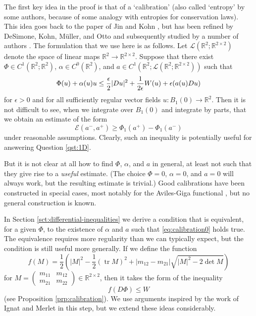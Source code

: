 \documentclass[a4paper]{article}
\newcommand{\R}{\mathbb{R}}
\let\div\relax\DeclareMathOperator{\div}{div}
\DeclareMathOperator{\tr}{tr}
\theoremstyle{definition}
\theoremstyle{remark}
\begin{document}
The first key idea in the proof is that of a `calibration' (also called `entropy' by some
authors, because of some analogy with entropies for conservation laws). This idea
goes back to the paper of Jin and Kohn \cite{Jin-Kohn:00}, but has been refined by
DeSimone, Kohn, M\"uller, and Otto \cite{DeSimone-Kohn-Mueller-Otto:01} and subsequently
studied by a number of authors
\cite{DeLellis-Otto:03, Ignat-Merlet:11, Ignat-Merlet:12, Ignat-Moser:12, Ignat-Monteil:20}.
The formulation that we use here is as follows. Let $\mathcal{L}(\R^2; \R^{2 \times 2})$
denote the space of linear maps $\R^2 \to \R^{2 \times 2}$. Suppose that there exist
$\Phi \in C^1(\R^2; \R^2)$, $\alpha \in C^0(\R^2)$, and $a \in C^1(\R^2; \mathcal{L}(\R^2; \R^{2 \times 2}))$
such that
\begin{equation} \label{eq:calibration0}
\div \Phi(u) + \alpha(u) \div u \le \frac{\epsilon}{2} |Du|^2 + \frac{1}{2\epsilon} W(u) + \epsilon \div(a(u) Du)
\end{equation}
for $\epsilon > 0$ and for all sufficiently regular vector fields $u \colon B_1(0) \to \R^2$.
Then it is not difficult to see, when we integrate over $B_1(0)$ and integrate by parts,
that we obtain an estimate of the form
\[
\mathcal{E}(a^-, a^+) \ge \Phi_1(a^+) - \Phi_1(a^-)
\]
under reasonable assumptions. Clearly, such an inequality is potentially useful for
answering Question \ref{qst:1D}.

But it is not clear at all how to find $\Phi$, $\alpha$, and $a$ in general, at least not
such that they give rise to a \emph{useful} estimate. (The choice $\Phi = 0$, $\alpha = 0$, and
$a = 0$ will always work, but the resulting estimate is trivial.) Good calibrations have
been constructed in special cases, most notably for the Aviles-Giga functional \cite{Jin-Kohn:00},
but no general construction is known.

In Section \ref{sct:differential-inequalities} we derive a condition that is equivalent, for a given
$\Phi$, to the existence of $\alpha$ and $a$ such that \eqref{eq:calibration0} holds true. The equivalence requires more regularity than we can typically
expect, but the condition is still useful more generally.
If we define the function
\[
f(M) = \frac{1}{2} \left(|M|^2 - \frac{1}{2} (\tr M)^2 + |m_{12} - m_{21}| \sqrt{|M|^2 - 2\det M}\right)
\]
for $M = (\begin{smallmatrix} m_{11} & m_{12} \\ m_{21} & m_{22} \end{smallmatrix}) \in \R^{2 \times 2}$,
then it takes the form of the inequality
\[
f(D\Phi) \le W
\]
(see Proposition \ref{prp:calibration}).
We use arguments inspired by the work of Ignat and Merlet \cite{Ignat-Merlet:11} in this step, but
we extend these ideas considerably.
\end{document}
